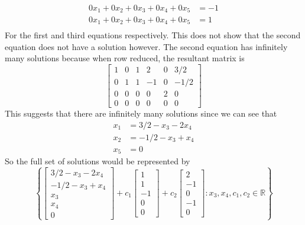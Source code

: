 \documentclass{report}
\begin{document}
$$
\begin{aligned}
0x_1 + 0x_2 + 0x_3 + 0x_4 + 0x_5 & = -1 \\
0x_1 + 0x_2 + 0x_3 + 0x_4 + 0x_5 & = 1 \\
\end{aligned}
$$
For the first and third equations respectively. This does not show that the second equation does not have a solution however. The second equation has infinitely many solutions because when row reduced, the resultant matrix is
$$
\left[
\begin{array}{ccccc|c}
1 & 0 & 1 & 2 & 0 & 3/2 \\
0 & 1 & 1 & -1 & 0 & -1/2 \\
0 & 0 & 0 & 0 & 2 & 0 \\
0 & 0 & 0 & 0 & 0 & 0
\end{array}
\right]
$$
This suggests that there are infinitely many solutions since we can see that
$$
\begin{aligned}
x_1 & = 3/2 - x_3 - 2x_4 \\
x_2 & = -1/2 - x_3 + x_4 \\
x_5 & = 0
\end{aligned}
$$
So the full set of solutions would be represented by
$$
\left\{
\begin{bmatrix} 
3/2 - x_3 - 2x_4 \\
-1/2 - x_3 + x_4 \\
x_3 \\
x_4 \\
0
\end{bmatrix}
+
c_1
\begin{bmatrix}
1 \\ 1 \\ -1 \\ 0 \\ 0
\end{bmatrix} 
+
c_2
\begin{bmatrix}
2 \\ -1 \\ 0 \\ -1 \\ 0
\end{bmatrix}
:
x_3,x_4,c_1,c_2\in\mathbb{R}
\right\}
$$
\end{document}
